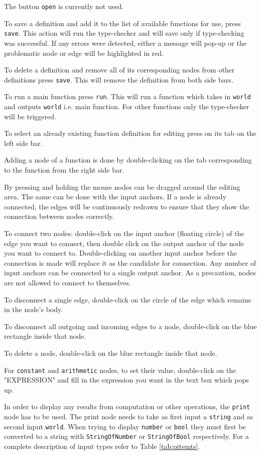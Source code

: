 \documentclass[12pt,UTF8,a4]{article}
\newcommand{\code}[1]{\texttt{#1}}
\newcommand{\type}[1]{\texttt{#1}}
\begin{document}
The button \code{open} is currently not used.

To save a definition and add it to the list of available functions for use, press \code{save}. This action will run the type-checker and will save only if type-checking was successful. If any errors were detected, either a message will pop-up or the problematic node or edge will be highlighted in red.

To delete a definition and remove all of its corresponding nodes from other definitions press \code{save}. This will remove the definition from both side bars.

To run a main function press \code{run}. This will run a function which takes in \type{world} and outputs \type{world} i.e. main function. For other functions only the type-checker will be triggered.

To select an already existing function definition for editing press on its tab on the left side bar.

Adding a node of a function is done by double-clicking on the tab corresponding to the function from the right side bar.

By pressing and holding the mouse nodes can be dragged around the editing area. The same can be done with the input anchors. If a node is already connected, the edges will be continuously redrawn to ensure that they show the connection between nodes correctly.

To connect two nodes: double-click on the input anchor (floating circle) of the edge you want to connect, then double click on the output anchor of the node you want to connect to. Double-clicking on another input anchor before the connection is made will replace it as the candidate for connection. Any number of input anchors can be connected to a single output anchor. As a precaution, nodes are not allowed to connect to themselves.

To disconnect a single edge, double-click on the circle of the edge which remains in the node's body.

To disconnect all outgoing and incoming edges to a node, double-click on the blue rectangle inside that node.

To delete a node, double-click on the blue rectangle inside that node.

For \code{constant} and \code{arithmetic} nodes, to set their value, double-click on the "EXPRESSION" and fill in the expression you want in the text box which pops up.

In order to display any results from computation or other operations, the \code{print} node has to be used. The print node needs to take as first input a \type{string} and as second input \type{world}. When trying to display \type{number} or \type{bool} they must first be converted to a string with \code{StringOfNumber} or \code{StringOfBool} respectively. For a complete description of input types refer to Table \ref{tab:pitemts}.
\end{document}
